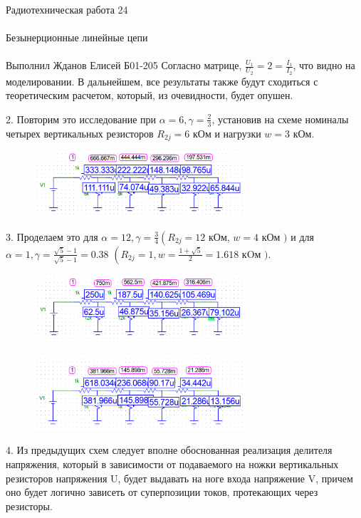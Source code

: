 \documentclass{astroedu-lab}
\begin{document}
\begin{problem}{\huge Радиотехническая работа 24\\\\Безынерционные линейные цепи\\\\Выполнил Жданов Елисей Б01-205}
Согласно матрице, $\frac{U_1}{U_2} = 2 = \frac{I_1}{I_2}$, что видно на моделировании. В дальнейшем, все результаты также будут сходиться с теоретическим расчетом, который, из очевидности, будет опушен.

2. Повторим это исследование при $\alpha=6, \gamma=\frac{2}{3}$, установив на схеме номиналы четырех вертикальных резисторов $R_{2 j}=6$ кОм и нагрузки $w=3$ кОм.

\begin{figure}[!h]
	\centering
	\includegraphics[width=0.7\textwidth]{19b.png}
	\label{fig:boiler}
\end{figure}

3. Проделаем это для $\alpha=12, \gamma=\frac{3}{4}\left(R_{2 j}=12\right.$ кОм, $w=4$ кОм $)$ и для $\alpha=1, \gamma=\frac{\sqrt{5}-1}{\sqrt{5}-1}=0.38$ $\left(R_{2 j}=1, w=\frac{1+\sqrt{5}}{2}=1.618\right.$ кOм $)$.

\begin{figure}[!h]
	\centering
	\includegraphics[width=0.7\textwidth]{19c.png}
	\label{fig:boiler}
\end{figure}

\begin{figure}[!h]
	\centering
	\includegraphics[width=0.7\textwidth]{19d.png}
	\label{fig:boiler}
\end{figure}

4. Из предыдущих схем следует вполне обоснованная реализация делителя напряжения, который в зависимости от подаваемого на ножки вертикальных резисторов напряжения U, будет выдавать на ноге входа напряжение V, причем оно будет логично зависеть от суперпозиции токов, протекающих через резисторы. 


\end{problem}
\end{document}
